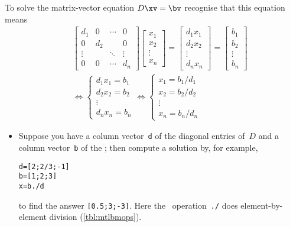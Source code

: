 \begin{compute}
To solve the matrix-vector equation \(D\xv=\bv\) recognise that this equation means
\begin{eqnarray}&&
\begin{bmatrix} d_1&0&\cdots&0
\\0&d_2&&0
\\\vdots&&\ddots&\vdots
\\0&0&\cdots&d_n \end{bmatrix}
\begin{bmatrix} x_1\\x_2\\\vdots\\x_n \end{bmatrix}
=\begin{bmatrix} d_1x_1\\d_2x_2\\\vdots\\d_nx_n \end{bmatrix}
=\begin{bmatrix} b_1\\b_2\\\vdots\\b_n \end{bmatrix}
\nonumber\\&&\iff
\begin{cases} d_1x_1=b_1\\d_2x_2=b_2\\\vdots\\d_nx_n=b_n \end{cases}
\iff
\begin{cases} x_1=b_1/d_1\\x_2=b_2/d_2\\\vdots\\x_n=b_n/d_n \end{cases}
\label{eq:ddslin}
\end{eqnarray}
\begin{itemize}
\item Suppose you have a column vector~\verb|d| of the diagonal entries of~\(D\) and a column vector~\verb|b| of the \rhs; then compute a solution by, for example,
\setbox\ajrqrbox\hbox{}%
\marginpar{\usebox{\ajrqrbox\\[2ex]}}%
\begin{verbatim}
d=[2;2/3;-1]
b=[1;2;3]
x=b./d
\end{verbatim}
to find the answer \verb|[0.5;3;-3]|.
Here the \script\ operation~\verb|./| does  element-by-element division (\autoref{tbl:mtlbmops}).


\end{itemize}
\end{compute}
